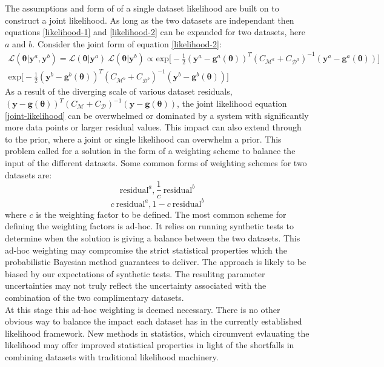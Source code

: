 The assumptions and form of of a single dataset likelihood are built on to construct a joint likelihood. As long as the two datasets are independant then equations \ref{likelihood-1} and \ref{likelihood-2} can be expanded for two datasets, here $a$ and $b$. Consider the joint form of equation \ref{likelihood-2}:
\begin{multline}
\mathcal{L}(\bm{\theta}|\bm{y}^a,\bm{y}^b) = \mathcal{L}(\bm{\theta}|\bm{y}^a)\ \mathcal{L}(\bm{\theta}|\bm{y}^b)
\propto \text{exp}\bigg[-\frac{1}{2}(\bm{y}^a-\bm{g}^a(\bm{\theta}))^T(C_{\mathcal{M}^a}+C_{\mathcal{D}^a})^{-1}(\bm{y}^a-\bm{g}^a(\bm{\theta}))\bigg]\ \\
\text{exp}\bigg[-\frac{1}{2}(\bm{y}^b-\bm{g}^b(\bm{\theta}))^T(C_{\mathcal{M}^b}+C_{\mathcal{D}^b})^{-1}(\bm{y}^b-\bm{g}^b(\bm{\theta}))\bigg]
\label{joint-likelihood}
\end{multline}
As a result of the diverging scale of various dataset residuals, $(\bm{y}-\bm{g}(\bm{\theta}))^T(C_{\mathcal{M}}+C_{\mathcal{D}})^{-1}(\bm{y}-\bm{g}(\bm{\theta}))$, the joint likelihood equation \ref{joint-likelihood} can be overwhelmed or dominated by a system with significantly more data points or larger residual values. This impact can also extend through to the prior, where a joint or single likelihood can overwhelm a prior. This problem called for a solution in the form of a weighting scheme to balance the input of the different datasets. Some common forms of weighting schemes for two datasets are:
\begin{equation}
\text{residual}^a, \frac{1}{c}\ \text{residual}^b
\end{equation}
\begin{equation}
c\ \text{residual}^a, 1-c\ \text{residual}^b
\end{equation}
where $c$ is the weighting factor to be defined. The most common scheme for defining the weighting factors is ad-hoc. It relies on running synthetic tests to determine when the solution is giving a balance between the two datasets. This ad-hoc weighting may compromise the strict statistical properties which the probabilistic Bayesian method guarantees to deliver. The approach is likely to be biased by our expectations of synthetic tests. The resulitng parameter uncertainties may not truly reflect the uncertainty associated with the combination of the two complimentary datasets. \\

At this stage this ad-hoc weighting is deemed necessary. There is no other obvious way to balance the impact each dataset has in the currently established likelihood framework. New methods in statistics, which circumvent evlauating the likelihood may offer improved statistical properties in light of the shortfalls in combining datasets with traditional likelihood machinery. \\

